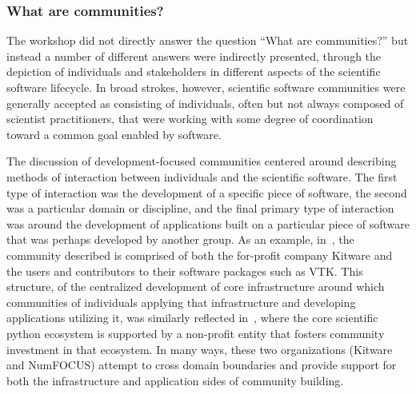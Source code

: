\documentclass[11pt, oneside]{amsart}
\newcommand{\toolname}[1] {\textsf{#1}}
\begin{document}

\subsubsection{What are communities?}

The workshop did not directly answer the question ``What are communities?'' but
instead a number of different answers were indirectly presented, through the
depiction of individuals and stakeholders in different aspects of the
scientific software lifecycle.  In broad strokes, however, scientific software
communities were generally accepted as consisting of individuals, often but not
always composed of scientist practitioners, that were working with some degree
of coordination toward a common goal enabled by software.

The discussion of development-focused communities centered around describing
methods of interaction between individuals and the scientific software.  The
first type of interaction was the development of a specific piece of software,
the second was a particular domain or discipline, and the final primary
type of interaction was around the development of applications built on a
particular piece of software that was perhaps developed by another group.  As
an example, in~\cite{Hanwell_WSSSPE}, the community described is comprised of
both the for-profit company \toolname{Kitware} and the users and contributors to their
software packages such as \toolname{VTK}.  This structure, of the centralized development
of core infrastructure around which communities of individuals applying that
infrastructure and developing applications utilizing it, was similarly
reflected in~\cite{Terrel_WSSSPE}, where the core scientific python ecosystem
is supported by a non-profit entity that fosters community investment in that
ecosystem.  In many ways, these two organizations (\toolname{Kitware} and \toolname{NumFOCUS})
attempt to cross domain boundaries and provide support for both the
infrastructure and application sides of community building.
\end{document}
